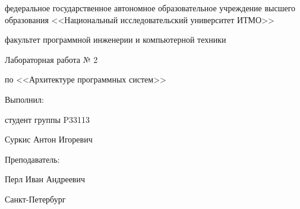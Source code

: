 \begin{titlepage}
    \begin{center}
        федеральное государственное автономное образовательное учреждение высшего образования
        <<Национальный исследовательский университет ИТМО>>

        \bigskip

        факультет программной инженерии и компьютерной техники

        \vfill

        {\Large
        Лабораторная работа № 2

        по <<Архитектуре программных систем>>
        }

        \bigskip

        \begin{flushright}
            Выполнил:

            студент группы P33113

            Суркис Антон Игоревич

            Преподаватель:

            Перл Иван Андреевич
        \end{flushright}

        \vfill

        Санкт-Петербург

        \the\year
    \end{center}
\end{titlepage}
